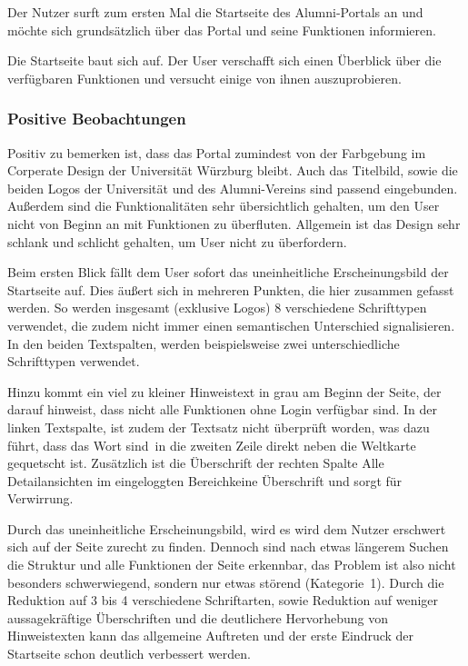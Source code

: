 Der Nutzer surft zum ersten Mal die Startseite des Alumni-Portals an und möchte sich grundsätzlich über das Portal und seine Funktionen informieren. 

Die Startseite baut sich auf. Der User verschafft sich einen Überblick über die verfügbaren Funktionen und versucht einige von ihnen auszuprobieren.

\subsubsection*{Positive Beobachtungen}
Positiv zu bemerken ist, dass das Portal zumindest von der Farbgebung im Corperate Design der Universität Würzburg bleibt. 
Auch das Titelbild, sowie die beiden Logos der Universität und des Alumni-Vereins sind passend eingebunden.
Außerdem sind die Funktionalitäten sehr übersichtlich gehalten, um den User nicht von Beginn an mit Funktionen zu überfluten. 
Allgemein ist das Design sehr schlank und schlicht gehalten, um User nicht zu überfordern. 

{Beim ersten Blick fällt dem User sofort das uneinheitliche Erscheinungsbild der Startseite auf. Dies äußert sich in mehreren Punkten, die hier zusammen gefasst werden. 
So werden insgesamt (exklusive Logos) 8 verschiedene Schrifttypen verwendet, die zudem nicht immer einen semantischen Unterschied signalisieren. In den beiden Textspalten, werden beispielsweise zwei unterschiedliche Schrifttypen verwendet. 

Hinzu kommt ein viel zu kleiner Hinweistext in grau am Beginn der Seite, der darauf hinweist, dass nicht alle Funktionen ohne Login verfügbar sind.
In der linken Textspalte, ist zudem der Textsatz nicht überprüft worden, was dazu führt, dass das Wort \glqq sind\grqq~in die zweiten Zeile direkt neben die Weltkarte gequetscht ist.
Zusätzlich ist die Überschrift der rechten Spalte \glqq Alle Detailansichten im eingeloggten Bereich\grqq keine Überschrift und sorgt für Verwirrung.
}
{Durch das uneinheitliche Erscheinungsbild, wird es wird dem Nutzer erschwert sich auf der Seite zurecht zu finden. Dennoch sind nach etwas längerem Suchen die Struktur und alle Funktionen der Seite erkennbar, das Problem ist also nicht besonders schwerwiegend, sondern nur etwas störend (Kategorie~1).
}
{Durch die Reduktion auf 3 bis 4 verschiedene Schriftarten, sowie Reduktion auf weniger aussagekräftige Überschriften und die deutlichere Hervorhebung von Hinweistexten kann das allgemeine Auftreten und der erste Eindruck der Startseite schon deutlich verbessert werden.
}\label{prob:start:erschbild}

